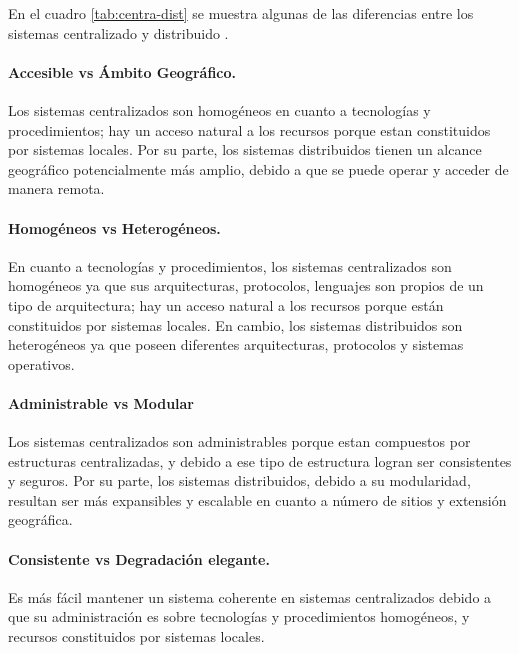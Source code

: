 En el cuadro \ref{tab:centra-dist} se muestra algunas de las diferencias entre los sistemas centralizado y distribuido \cite{Verissimo2012}.

\paragraph{Accesible vs Ámbito Geográfico.}
Los sistemas centralizados son  homogéneos  en cuanto a tecnologías y procedimientos; hay un acceso  natural a los \gls{recursos} porque estan constituidos por  sistemas locales.  
Por su parte, los sistemas distribuidos  tienen un alcance geográfico potencialmente más amplio, debido a que se puede operar y acceder de manera remota.  

\paragraph{Homogéneos vs Heterogéneos.}
En cuanto a  tecnologías y procedimientos, los sistemas centralizados son homogéneos ya que sus arquitecturas, protocolos, lenguajes son propios de un tipo de arquitectura; hay un acceso  natural a los \gls{recursos} porque están constituidos por sistemas locales. En cambio, los sistemas distribuidos son heterogéneos ya que poseen diferentes arquitecturas, protocolos y  sistemas operativos. 

\paragraph{Administrable vs Modular}
Los sistemas centralizados son administrables porque estan compuestos por estructuras centralizadas, y debido a ese tipo de estructura logran ser consistentes y seguros. Por su parte, los sistemas distribuidos,  debido a su modularidad,  resultan ser más expansibles y  escalable en cuanto a número de sitios y extensión geográfica.   

\paragraph{Consistente vs Degradación elegante.}
Es más fácil mantener un sistema coherente en  sistemas centralizados debido a que  su administración es sobre tecnologías y procedimientos homogéneos, y  recursos  constituidos por sistemas locales. 

